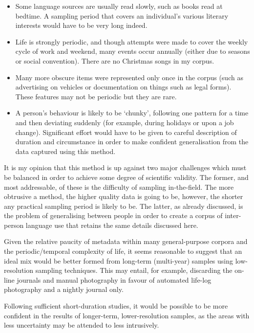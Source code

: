 \begin{itemize}
    \item Some language sources are usually read slowly, such as books read at bedtime.  A sampling period that covers an individual's various literary interests would have to be very long indeed.
    \item Life is strongly periodic, and though attempts were made to cover the weekly cycle of work and weekend, many events occur annually (either due to seasons or social convention).  There are no Christmas songs in my corpus.
    \item Many more obscure items were represented only once in the corpus (such as advertising on vehicles or documentation on things such as legal forms).  These features may not be periodic but they are rare.
    \item A person's behaviour is likely to be `chunky', following one pattern for a time and then deviating suddenly (for example, during holidays or upon a job change).  Significant effort would have to be given to careful description of duration and circumstance in order to make confident generalisation from the data captured using this method.
\end{itemize}

It is my opinion that this method is up against two major challenges which must be balanced in order to achieve some degree of scientific validity.  The former, and most addressable, of these is the difficulty of sampling in-the-field.  The more obtrusive a method, the higher quality data is going to be, however, the shorter any practical sampling period is likely to be.  The latter, as already discussed, is the problem of generalising between people in order to create a corpus of inter-person language use that retains the same details discussed here.

Given the relative paucity of metadata within many general-purpose corpora and the periodic/temporal complexity of life, it seems reasonable to suggest that an ideal mix would be better formed from long-term (multi-year) samples using low-resolution sampling techniques.  This may entail, for example, discarding the on-line journals and manual photography in favour of automated life-log photography and a nightly journal only.

Following sufficient short-duration studies, it would be possible to be more confident in the results of longer-term, lower-resolution samples, as the areas with less uncertainty may be attended to less intrusively.







